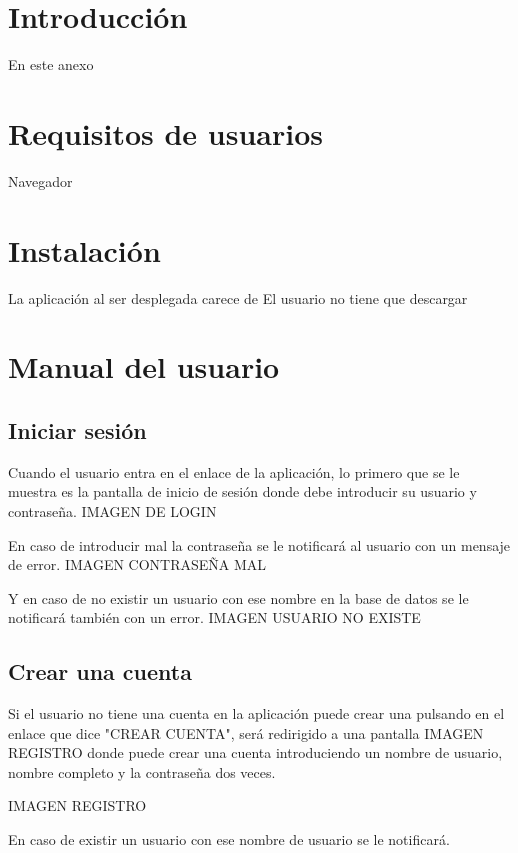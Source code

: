 
\section{Introducción}
En este anexo


\section{Requisitos de usuarios}

Navegador

\section{Instalación}

La aplicación al ser desplegada carece de 
El usuario no tiene que descargar

\section{Manual del usuario}


\subsection{Iniciar sesión}\label{inicio-sesión}
Cuando el usuario entra en el enlace de la aplicación, lo primero que se le muestra es la pantalla de inicio de sesión donde debe introducir su usuario y contraseña.
IMAGEN DE LOGIN

En caso de introducir mal la contraseña se le notificará al usuario con un mensaje de error.
IMAGEN CONTRASEÑA MAL

Y en caso de no existir un usuario con ese nombre en la base de datos se le notificará también con un error.
IMAGEN USUARIO NO EXISTE


\subsection{Crear una cuenta}\label{crear-cuenta}

Si el usuario no tiene una cuenta en la aplicación puede crear una pulsando en el enlace que dice "CREAR CUENTA", será redirigido a una pantalla IMAGEN REGISTRO donde puede crear una cuenta introduciendo un nombre de usuario, nombre completo y la contraseña dos veces.

IMAGEN REGISTRO

En caso de existir un usuario con ese nombre de usuario se le notificará.

